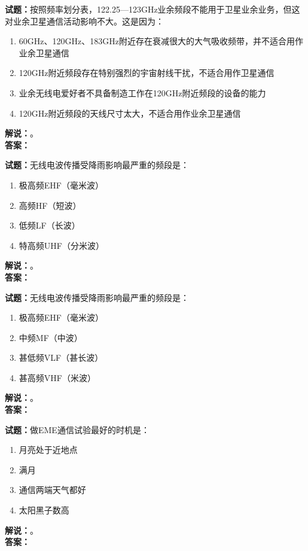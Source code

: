 \documentclass{ctexbook}
\begin{document}
\noindent\textbf{试题：}按照频率划分表，122.25—123\unit{\GHz}业余频段不能用于卫星业余业务，但这对业余卫星通信活动影响不大。这是因为：
\begin{enumerate}[leftmargin=3em]
  \item 60\unit{\GHz}、120\unit{\GHz}、183\unit{\GHz}附近存在衰减很大的大气吸收频带，并不适合用作业余卫星通信
  \item 120\unit{\GHz}附近频段存在特别强烈的宇宙射线干扰，不适合用作卫星通信
  \item 业余无线电爱好者不具备制造工作在120\unit{\GHz}附近频段的设备的能力
  \item 120\unit{\GHz}附近频段的天线尺寸太大，不适合用作业余卫星通信
\end{enumerate}
\noindent\textbf{解说：}\textbf{}。\\\noindent\textbf{答案：}

\vspace{\baselineskip}

\noindent\textbf{试题：}无线电波传播受降雨影响最严重的频段是：
\begin{enumerate}[leftmargin=3em]
  \item 极高频EHF（毫米波）
  \item 高频HF（短波）
  \item 低频LF（长波）
  \item 特高频UHF（分米波）
\end{enumerate}
\noindent\textbf{解说：}\textbf{}。\\\noindent\textbf{答案：}

\vspace{\baselineskip}

\noindent\textbf{试题：}无线电波传播受降雨影响最严重的频段是：
\begin{enumerate}[leftmargin=3em]
  \item 极高频EHF（毫米波）
  \item 中频MF（中波）
  \item 甚低频VLF（甚长波）
  \item 甚高频VHF（米波）
\end{enumerate}
\noindent\textbf{解说：}\textbf{}。\\\noindent\textbf{答案：}

\vspace{\baselineskip}

\noindent\textbf{试题：}做EME通信试验最好的时机是：
\begin{enumerate}[leftmargin=3em]
  \item 月亮处于近地点
  \item 满月
  \item 通信两端天气都好
  \item 太阳黑子数高
\end{enumerate}
\noindent\textbf{解说：}\textbf{}。\\\noindent\textbf{答案：}
\end{document}
